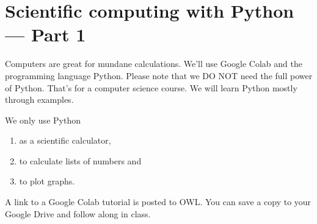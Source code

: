 \documentclass[../main.tex]{subfiles}
\begin{document}
 \section{Scientific computing with Python --- Part 1}

Computers are great for mundane calculations. We'll use Google Colab and the programming language Python. Please note that we DO NOT need the full power of Python. That's for a computer science course.  We will learn Python mostly through examples. 

We only use Python 
\begin{enumerate}
  \item as a scientific calculator,
  \item to calculate lists of numbers and
  \item to plot graphs.
\end{enumerate}

A link to a Google Colab tutorial is posted to OWL. You can save a copy to your Google Drive and follow along in class.
\end{document}
